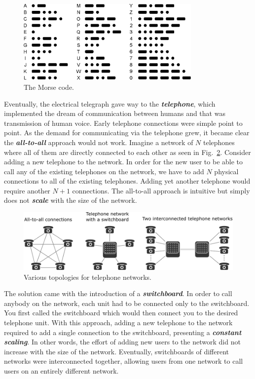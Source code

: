 \begin{figure}[t]
    \centering
    \includegraphics[width=0.8\textwidth]{lesson1/1-1_morse.eps}
    \caption[The Morse code]{The Morse code.}
    \label{fig:1-1_morse}
\end{figure}

Eventually, the electrical telegraph gave way to the \textit{\textbf{telephone}}, which implemented the dream of communication between humans and that was transmission of human voice.
Early telephone connections were simple point to point.
As the demand for communicating via the telephone grew, it became clear the \textit{\textbf{all-to-all}} approach would not work.
Imagine a network of $N$ telephones where all of them are directly connected to each other as seen in Fig.~\ref{fig:1-1_telephone}.
Consider adding a new telephone to the network.
In order for the new user to be able to call any of the existing telephones on the network, we have to add $N$ physical connections to all of the existing telephones.
Adding yet another telephone would require another $N+1$ connections.
The all-to-all approach is intuitive but simply does not \textit{\textbf{scale}} with the size of the network.

\begin{figure}[h]
    \centering
    \includegraphics[width=\textwidth]{lesson1/1-1_rotary_telephone.pdf}
    \caption[Telephone networks]{Various topologies for telephone networks.}
    \label{fig:1-1_telephone}
\end{figure}

The solution came with the introduction of a \textit{\textbf{switchboard}}.
In order to call anybody on the network, each unit had to be connected only to the switchboard.
You first called the switchboard which would then connect you to the desired telephone unit.
With this approach, adding a new telephone to the network required to add a single connection to the switchboard, presenting a \textit{\textbf{constant scaling}}.
In other words, the effort of adding new users to the network did not increase with the size of the network.
Eventually, switchboards of different networks were interconnected together, allowing users from one network to call users on an entirely different network.

